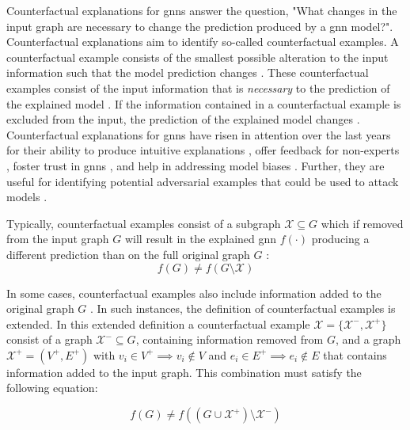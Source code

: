 Counterfactual explanations for \glspl{gnn} answer the question, "What changes in the input graph are necessary to change the prediction produced by a \gls{gnn} model?". Counterfactual explanations aim to identify so-called counterfactual examples. A counterfactual example consists of the smallest possible alteration to the input information such that the model prediction changes \cite{kakkad_survey_2023}. These counterfactual examples consist of the input information that is \textit{necessary} to the prediction of the explained model \cite{tan_learning_2022}. If the information contained in a counterfactual example is excluded from the input, the prediction of the explained model changes \cite{tan_learning_2022}. Counterfactual explanations for \glspl{gnn} have risen in attention over the last years \cite{ma_clear_2022} for their ability to produce intuitive explanations \cite{ma_clear_2022}, offer feedback for non-experts \cite{prado-romero_survey_2023}, foster trust in \glspl{gnn} \cite{prado-romero_survey_2023}, and help in addressing model biases \cite{prado-romero_survey_2023}. Further, they are useful for identifying potential adversarial examples that could be used to attack models \cite{lucic_cf-gnnexplainer_2022}.

\newpage

Typically, counterfactual examples consist of a subgraph $\mathcal{X} \subseteq G$ which if removed from the input graph $G$ will result in the explained \gls{gnn} $f(\cdot)$ producing a different prediction than on the full original graph $G$ \cite{tan_learning_2022}:
\begin{equation}
    \label{e_cf_explanation}
    f(G) \neq f(G\setminus \mathcal{X})
\end{equation}

In some cases, counterfactual examples also include information added to the original graph $G$ \cite{abrate_counterfactual_2021}. In such instances, the definition of counterfactual examples is extended. In this extended definition a counterfactual example $\mathcal{X} = \{\mathcal{X}^-, \mathcal{X}^+\}$ consist of a graph $\mathcal{X}^- \subseteq G$, containing information removed from $G$, and a graph $\mathcal{X}^+ = (V^+, E^+)$ with ${v_i \in V^+ \implies v_i \notin V}$ and $e_i \in E^+ \implies e_i \notin E$ that contains information added to the input graph. This combination must satisfy the following equation:

\begin{equation}
    f(G) \neq f((G \cup \mathcal{X}^+) \setminus \mathcal{X^-})
\end{equation}

